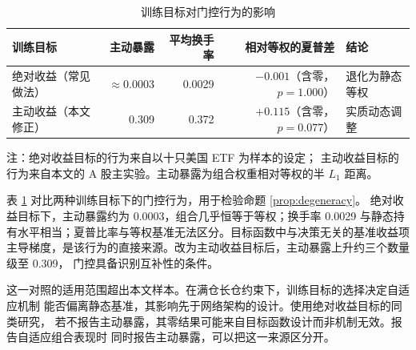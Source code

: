 \begin{table}[htbp]
\centering
\caption{训练目标对门控行为的影响}
\label{tab:degeneracy}
\begin{threeparttable}
\footnotesize
\begin{tabular}{p{2.9cm}rrrp{2.4cm}}
\toprule
训练目标 & 主动暴露 & 平均换手率 & 相对等权的夏普差 & 结论 \\
\midrule
绝对收益（常见做法） & $\approx0.0003$ & 0.0029 & $-0.001$（含零，$p=1.000$） & 退化为静态等权 \\
主动收益（本文修正） & 0.309 & 0.372 & $+0.115$（含零，$p=0.077$） & 实质动态调整 \\
\bottomrule
\end{tabular}
\begin{tablenotes}[flushleft]\footnotesize
\item 注：绝对收益目标的行为来自以十只美国 ETF 为样本的设定；
主动收益目标的行为来自本文的 A 股主实验。主动暴露为组合权重相对等权的半 $L_1$ 距离。
\end{tablenotes}
\end{threeparttable}
\end{table}

表 \ref{tab:degeneracy} 对比两种训练目标下的门控行为，用于检验命题 \ref{prop:degeneracy}。
绝对收益目标下，主动暴露约为 $0.0003$，组合几乎恒等于等权；换手率 0.0029
与静态持有水平相当；夏普比率与等权基准无法区分。目标函数中与决策无关的基准收益项
主导梯度，是该行为的直接来源。改为主动收益目标后，主动暴露上升约三个数量级至 0.309，
门控具备识别互补性的条件。

这一对照的适用范围超出本文样本。在满仓长仓约束下，训练目标的选择决定自适应机制
能否偏离静态基准，其影响先于网络架构的设计。使用绝对收益目标的同类研究，
若不报告主动暴露，其零结果可能来自目标函数设计而非机制无效。报告自适应组合表现时
同时报告主动暴露，可以把这一来源区分开。

